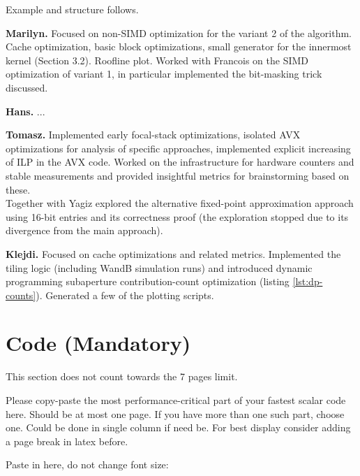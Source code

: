 \documentclass[letterpaper]{article}
\newcommand{\mypar}[1]{{\bf #1.}}
\begin{document}
Example and structure follows.

\mypar{Marilyn} Focused on non-SIMD optimization for the variant 2 of the algorithm. Cache optimization, basic block optimizations, small generator for the innermost kernel (Section 3.2). Roofline plot. Worked with Francois on the SIMD optimization of variant 1, in particular implemented the bit-masking trick discussed.

\mypar{Hans} ...

\mypar{Tomasz} Implemented early focal-stack optimizations, isolated AVX optimizations for analysis of specific approaches, implemented explicit increasing of ILP in the AVX code. Worked on the infrastructure for hardware counters and stable measurements and provided insightful metrics for brainstorming based on these. \\ Together with Yagiz explored the alternative fixed-point approximation approach using 16-bit entries and its correctness proof (the exploration stopped due to its divergence from the main approach). 

\mypar{Klejdi} Focused on cache optimizations and related metrics. Implemented the tiling logic (including WandB simulation runs) and
introduced dynamic programming subaperture contribution-count optimization (listing \ref{lst:dp-counts}). Generated a few of the plotting scripts.

\section{Code (Mandatory)}
This section does not count towards the 7 pages limit.

Please copy-paste the most performance-critical part of your fastest scalar code here. Should be at most one page. If you have more than one such part, choose one. Could be done in single column if need be. For best display consider adding a page break in latex before.

Paste in here, do not change font size:
\end{document}
